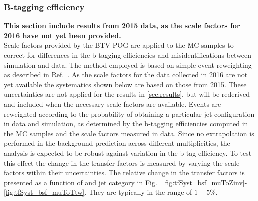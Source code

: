 \subsubsection*{B-tagging efficiency}
\label{sec:tfSyst_btag}
\textbf{This section include results from 2015 data, as the scale factors for 2016 have not yet been provided.}\\
Scale factors provided by the BTV POG are applied to the MC samples
to correct for differences in the b-tagging efficiencies and 
misidentifications between simulation and data. 
The method employed is
based on simple event reweighting as described in
Ref.~\cite{btagSFMethods}. As the scale factors for the data collected in
2016 are not yet available the systematics shown below are based 
on those from 2015. These uncertainties are not applied for the results in \ref{sec:results},
but will be rederived and included when the necessary scale factors are available.
Events are reweighted according to the probability of obtaining a particular jet configuration in data
and simulation, as determined by the b-tagging efficiencies computed
in the MC samples and the scale factors measured in data.
Since no extrapolation is performed in the background prediction across different 
\nb  multiplicities, the analysis is expected to be robust against variation in the 
b-tag efficiency. 
To test this effect the change in the transfer factors is measured
by varying the scale factors within their uncertainties. 
The relative change in the transfer factors is presented as a function of \scalht and jet category 
in Fig. ~\ref{fig:tfSyst_bsf_muToZinv}-\ref{fig:tfSyst_bsf_muToTtw}.
They are typically in the range of $1-5\%$.



